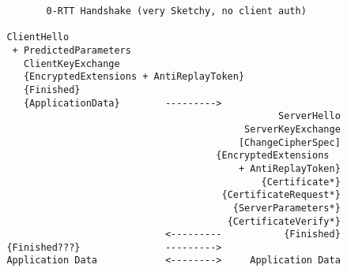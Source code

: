 \documentclass[helvetica]{seminar}
\begin{document}
\begin{slide}
\begin{footnotesize}
\begin{verbatim}
                0-RTT Handshake (very Sketchy, no client auth)

         ClientHello
          + PredictedParameters
            ClientKeyExchange
            {EncryptedExtensions + AntiReplayToken}
            {Finished}
            {ApplicationData}        --------->
                                                         ServerHello
                                                   ServerKeyExchange
                                                  [ChangeCipherSpec]
                                              {EncryptedExtensions
                                                  + AntiReplayToken}
                                                      {Certificate*}
                                               {CertificateRequest*}
                                                 {ServerParameters*}
                                                {CertificateVerify*}
                                     <---------           {Finished}
         {Finished???}               --------->
         Application Data            <-------->     Application Data
            
\end{verbatim}
\end{footnotesize}
\end{slide}
\end{document}
